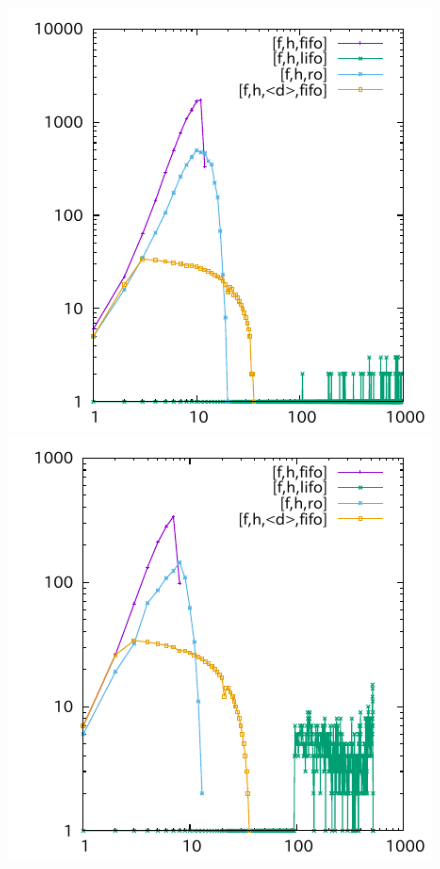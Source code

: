 \begin{figure}[tb]
\includegraphics{img/depth/depot-fuel/p07.pdf}
\includegraphics{img/depth/driverlog-fuel/p04.pdf}

\end{figure}
